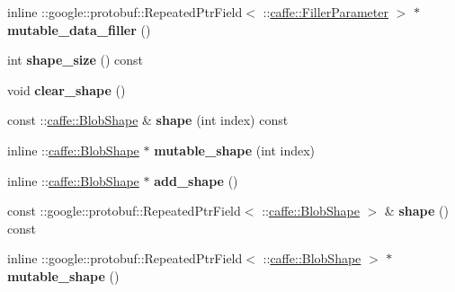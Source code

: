 \begin{DoxyCompactItemize}
\item 
\mbox{\label{classcaffe_1_1_dummy_data_parameter_a3780bb1efd2707f30ebaa956794014f1}} 
inline \+::google\+::protobuf\+::\+Repeated\+Ptr\+Field$<$ \+::\mbox{\hyperlink{classcaffe_1_1_filler_parameter}{caffe\+::\+Filler\+Parameter}} $>$ $\ast$ {\bfseries mutable\+\_\+data\+\_\+filler} ()
\item 
\mbox{\label{classcaffe_1_1_dummy_data_parameter_afe030d2284c80ed232d1629907746ff3}} 
int {\bfseries shape\+\_\+size} () const
\item 
\mbox{\label{classcaffe_1_1_dummy_data_parameter_a3c5d8f18bacce9cf1627795008f73ebb}} 
void {\bfseries clear\+\_\+shape} ()
\item 
\mbox{\label{classcaffe_1_1_dummy_data_parameter_a9ec16e464476cafefe74037b74d038b9}} 
const \+::\mbox{\hyperlink{classcaffe_1_1_blob_shape}{caffe\+::\+Blob\+Shape}} \& {\bfseries shape} (int index) const
\item 
\mbox{\label{classcaffe_1_1_dummy_data_parameter_a2e55c41bdf34073eda74c9dd0f509dad}} 
inline \+::\mbox{\hyperlink{classcaffe_1_1_blob_shape}{caffe\+::\+Blob\+Shape}} $\ast$ {\bfseries mutable\+\_\+shape} (int index)
\item 
\mbox{\label{classcaffe_1_1_dummy_data_parameter_a5346b2aa07131be64f8650a6357e60bc}} 
inline \+::\mbox{\hyperlink{classcaffe_1_1_blob_shape}{caffe\+::\+Blob\+Shape}} $\ast$ {\bfseries add\+\_\+shape} ()
\item 
\mbox{\label{classcaffe_1_1_dummy_data_parameter_a21f884bdc85f9841f59dd1f6456cb3a5}} 
const \+::google\+::protobuf\+::\+Repeated\+Ptr\+Field$<$ \+::\mbox{\hyperlink{classcaffe_1_1_blob_shape}{caffe\+::\+Blob\+Shape}} $>$ \& {\bfseries shape} () const
\item 
\mbox{\label{classcaffe_1_1_dummy_data_parameter_acb340b22cbdec6b9c2876772508a62b8}} 
inline \+::google\+::protobuf\+::\+Repeated\+Ptr\+Field$<$ \+::\mbox{\hyperlink{classcaffe_1_1_blob_shape}{caffe\+::\+Blob\+Shape}} $>$ $\ast$ {\bfseries mutable\+\_\+shape} ()

\end{DoxyCompactItemize}
